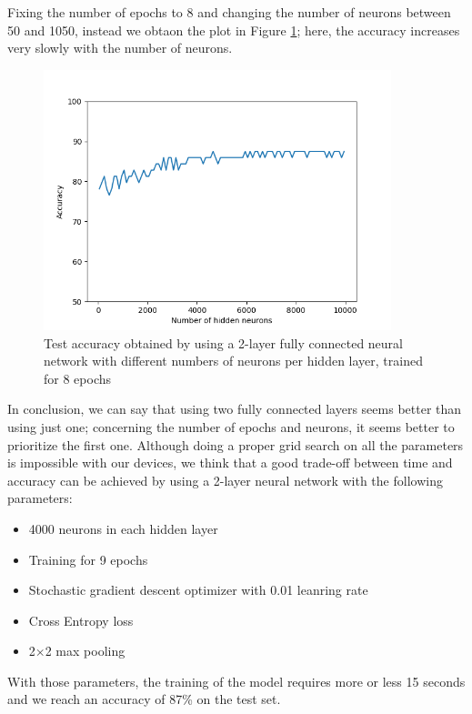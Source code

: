 \documentclass[12pt]{article}
\begin{document}
Fixing the number of epochs to 8 and changing the number of neurons between 50 and 1050, instead we obtaon the plot in Figure \ref{fig:ex3_FCNN_neurons}; here, the accuracy increases very slowly with the number of neurons.
\begin{figure}[h]
	\centering
	\includegraphics[width = 0.9\textwidth]{ex3_FCNN2l_accuracy-neurons.png}
	\caption{Test accuracy obtained by using a 2-layer fully connected neural network with different numbers of neurons per hidden layer, trained for 8 epochs}
	\label{fig:ex3_FCNN_neurons}
\end{figure}
In conclusion, we can say that using two fully connected layers seems better than using just one; concerning the number of epochs and neurons, it seems better to prioritize the first one.\newline
Although doing a proper grid search on all the parameters is impossible with our devices, we think that a good trade-off between time and accuracy can be achieved by using a 2-layer neural network with the following parameters:
\begin{itemize}
	\item 4000 neurons in each hidden layer
	\item Training for 9 epochs
	\item Stochastic gradient descent optimizer with 0.01 leanring rate
	\item Cross Entropy loss
	\item 2$\times$2 max pooling
\end{itemize}
With those parameters, the training of the model requires more or less 15 seconds and we reach an accuracy of 87\% on the test set.
\end{document}
